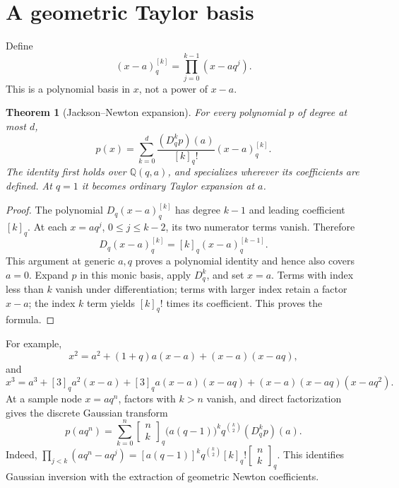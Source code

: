 \documentclass[11pt,a4paper,oneside,openany]{book}
\newtheorem{theorem}{Theorem}[chapter]
\theoremstyle{definition}
\theoremstyle{remark}
\newcommand{\Q}{\mathbb Q}
\newcommand{\GB}[3][q]{\begin{bmatrix}#2\\#3\end{bmatrix}_{#1}}
\newcommand{\qf}[2][q]{[#2]_{#1}!}
\begin{document}
\section{A geometric Taylor basis}
Define
\begin{equation}\label{qcc:q-newton-basis}
 (x-a)_{q}^{[k]}=\prod_{j=0}^{k-1}(x-aq^j).
\end{equation}
This is a polynomial basis in \(x\), not a power of \(x-a\).
\begin{theorem}[Jackson--Newton expansion]\label{qcc:q-taylor}
For every polynomial \(p\) of degree at most \(d\),
\begin{equation}\label{qcc:q-taylor-formula}
 p(x)=\sum_{k=0}^d\frac{(D_q^kp)(a)}{\qf k}(x-a)_q^{[k]}.
\end{equation}
The identity first holds over \(\Q(q,a)\), and specializes wherever its
coefficients are defined. At \(q=1\) it becomes ordinary Taylor expansion at
\(a\).
\end{theorem}
\begin{proof}
The polynomial \(D_q(x-a)_q^{[k]}\) has degree \(k-1\) and leading coefficient
\([k]_q\). At each \(x=aq^j\), \(0\le j\le k-2\), its two numerator terms
vanish. Therefore
\[
 D_q(x-a)_q^{[k]}=[k]_q(x-a)_q^{[k-1]}.
\]
This argument at generic \(a,q\) proves a polynomial identity and hence also
covers \(a=0\). Expand \(p\) in this monic basis, apply \(D_q^k\), and set
\(x=a\). Terms with index less than \(k\) vanish under differentiation; terms
with larger index retain a factor \(x-a\); the index \(k\) term yields
\([k]_q!\) times its coefficient. This proves the formula.
\end{proof}
For example,
\[
 x^2=a^2+(1+q)a(x-a)+(x-a)(x-aq),
\]
and
\[
 x^3=a^3+[3]_qa^2(x-a)+[3]_qa(x-a)(x-aq)
                  +(x-a)(x-aq)(x-aq^2).
\]
At a sample node \(x=aq^n\), factors with \(k>n\) vanish, and direct
factorization gives the discrete Gaussian transform
\begin{equation}\label{qcc:sample-transform}
 p(aq^n)=\sum_{k=0}^n\GB nk\bigl(a(q-1)\bigr)^k
                  q^{\binom k2}(D_q^kp)(a).
\end{equation}
Indeed,
\(\prod_{j<k}(aq^n-aq^j)
 =[a(q-1)]^kq^{\binom k2}[k]_q!\GB nk\).
This identifies Gaussian inversion with the extraction of geometric Newton
coefficients.
\end{document}
